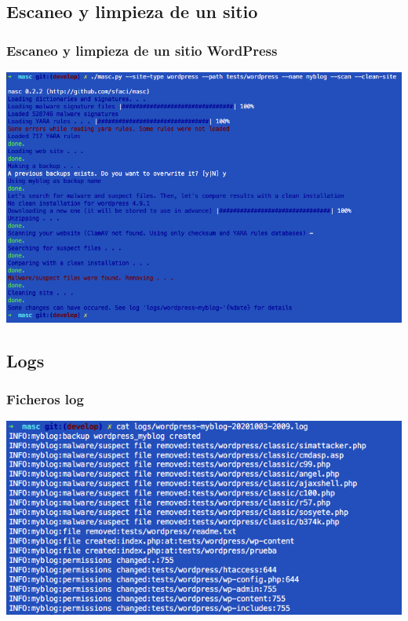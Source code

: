 \documentclass[xcolor={dvipsnames}]{beamer}
\begin{document}
\subsection{Escaneo y limpieza de un sitio}
\begin{frame}\frametitle{Escaneo y limpieza de un sitio WordPress}
    \includegraphics[scale=0.35]{complete}
\end{frame}

\subsection{Logs}
\begin{frame}\frametitle{Ficheros log}
    \includegraphics[scale=0.4]{log}
\end{frame}
\end{document}
